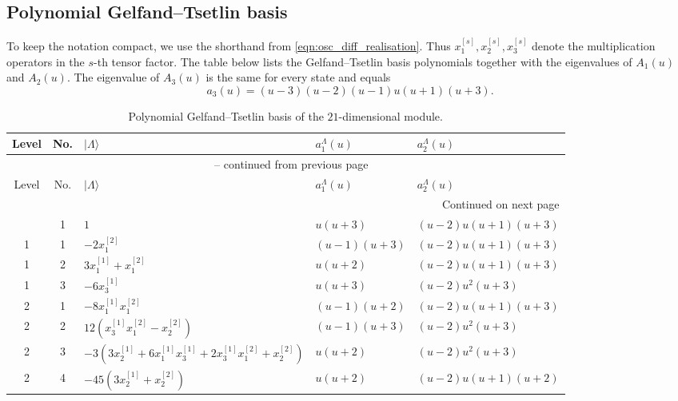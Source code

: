 \documentclass[12pt,reqno]{amsart}
\newcommand{\ket}[1]{{| #1 \rangle}}      %
\numberwithin{equation}{section}
\begin{document}
	\subsection{Polynomial Gelfand--Tsetlin basis}
	\label{app:21_GT_basis}
	To keep the notation compact, we use the shorthand from \eqref{eqn:osc_diff_realisation}. Thus $x_1^{[s]},x_2^{[s]},x_3^{[s]}$ denote the multiplication operators in the $s$-th tensor factor. The table below lists the Gelfand--Tsetlin basis polynomials together with the eigenvalues of $A_1(u)$ and $A_2(u)$. The eigenvalue of $A_3(u)$ is the same for every state and equals
	\begin{equation}
		a_3(u)=(u-3)(u-2)(u-1)u(u+1)(u+3).
	\end{equation}

	{\footnotesize
	\renewcommand{\arraystretch}{1.02}
	\setlength{\tabcolsep}{3pt}
	\begin{longtable}{c c >{\raggedright\arraybackslash}p{8.2cm} >{\raggedright\arraybackslash}p{2.2cm} >{\raggedright\arraybackslash}p{3.0cm}}
	\caption{Polynomial Gelfand--Tsetlin basis of the $21$-dimensional module.}\label{tab:21_GT_basis}\\
	\hline
	Level & No. & $\ket{\Lambda}$ & $a_1^\Lambda(u)$ & $a_2^\Lambda(u)$\\
	\hline
	\endfirsthead
	\multicolumn{5}{c}{\tablename\ \thetable\ -- continued from previous page}\\
	\hline
	Level & No. & $\ket{\Lambda}$ & $a_1^\Lambda(u)$ & $a_2^\Lambda(u)$\\
	\hline
	\endhead
	\hline
	\multicolumn{5}{r}{Continued on next page}\\
	\endfoot
	\hline
	\endlastfoot
	0 & 1 & $1$ & $u(u+3)$ & $(u-2)u(u+1)(u+3)$\\
	1 & 1 & $-2x_1^{[2]}$ & $(u-1)(u+3)$ & $(u-2)u(u+1)(u+3)$\\
	1 & 2 & $3x_1^{[1]}+x_1^{[2]}$ & $u(u+2)$ & $(u-2)u(u+1)(u+3)$\\
	1 & 3 & $-6x_3^{[1]}$ & $u(u+3)$ & $(u-2)u^2(u+3)$\\
	2 & 1 & $-8x_1^{[1]}x_1^{[2]}$ & $(u-1)(u+2)$ & $(u-2)u(u+1)(u+3)$\\
	2 & 2 & $12(x_3^{[1]}x_1^{[2]}-x_2^{[2]})$ & $(u-1)(u+3)$ & $(u-2)u^2(u+3)$\\
	2 & 3 & $-3(3x_2^{[1]}+6x_1^{[1]}x_3^{[1]}+2x_3^{[1]}x_1^{[2]}+x_2^{[2]})$ & $u(u+2)$ & $(u-2)u^2(u+3)$\\
	2 & 4 & $-45(3x_2^{[1]}+x_2^{[2]})$ & $u(u+2)$ & $(u-2)u(u+1)(u+2)$\\

\end{longtable}}
\end{document}
